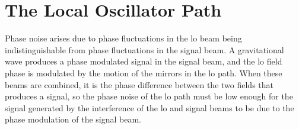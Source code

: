 \section{The Local Oscillator Path}
\label{sec:BHD_for_ligo_LO_stability}
Phase noise arises due to phase fluctuations in the \gls{lo} beam being indistinguishable from phase fluctuations in the signal beam. A gravitational wave produces a phase modulated signal in the signal beam, and the \gls{lo} field phase is modulated by the motion of the mirrors in the \gls{lo} path. When these beams are combined, it is the phase difference between the two fields that produces a signal, so the phase noise of the \gls{lo} path must be low enough for the signal generated by the interference of the \gls{lo} and signal beams to be due to the phase modulation of the signal beam. 
\par
